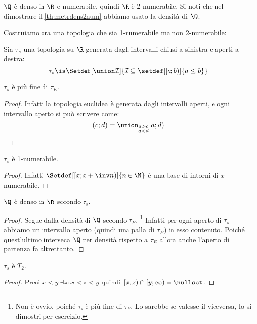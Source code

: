 \begin{es}
	$\Q$ è denso in $\R$ e numerabile, quindi $\R$ è 2-numerabile.
	Si noti che nel dimostrare il \autoref{th:metrdens2num} abbiamo usato la densità di $\Q$.
\end{es}

Costruiamo ora una topologia che sia 1-numerabile ma non 2-numerabile:

\begin{defn}
	Sia $\tau_s$ una topologia su $\R$ generata dagli intervalli chiusi a sinistra e aperti a destra:
	\[\tau_s\is\Setdef[\union\mathcal I]{\mathcal I\subseteq\setdef[[a;b)]{a\leq b}}\]
\end{defn}

\begin{prop}
	$\tau_s$ è più fine di $\tau_E$.
\end{prop}

\begin{proof}
	Infatti la topologia euclidea è generata dagli intervalli aperti,
	e ogni intervallo aperto si può scrivere come:
	\[(c;d)=\union_{\substack{a>c\\a<d}}[a;d)
	\qedhere\]
\end{proof}

\begin{prop}
	$\tau_s$ è 1-numerabile.
\end{prop}

\begin{proof}
	Infatti $\Setdef[\left[x;x+\inv n\right)]{n\in\N}$ è una base di intorni di $x$ numerabile.
\end{proof}

\begin{prop}
	$\Q$ è denso in $\R$ secondo $\tau_s$.
\end{prop}

\begin{proof}
	Segue dalla densità di $\Q$ secondo $\tau_E$. \footnote{Non è ovvio, poiché $\tau_s$ è più fine di $\tau_E$. Lo sarebbe se valesse il viceversa, lo si dimostri per esercizio.}
	Infatti per ogni aperto di $\tau_s$ abbiamo un intervallo aperto (quindi una palla di $\tau_E$) in esso contenuto. Poiché quest'ultimo interseca $\Q$ per densità rispetto a $\tau_E$ allora anche l'aperto di partenza fa altrettanto.
\end{proof}

\begin{prop}
	$\tau_s$ è $T_2$.
\end{prop}

\begin{proof}
	Presi $x<y\ \exists z:x<z<y$ quindi $[x;z)\cap[y;\infty)=\nullset$.
\end{proof}

